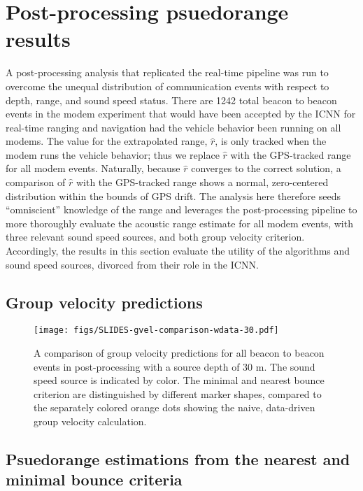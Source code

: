\FloatBarrier
\section{\label{sec:5} Post-processing psuedorange results}

A post-processing analysis that replicated the real-time pipeline was run to overcome the unequal distribution of communication events with respect to depth, range, and sound speed status.
There are 1242 total beacon to beacon events in the modem experiment that would have been accepted by the ICNN for real-time ranging and navigation had the vehicle behavior been running on all modems.
The value for the extrapolated range, $\hat{r}$, is only tracked when the modem runs the vehicle behavior; thus we replace $\hat{r}$ with the GPS-tracked range for all modem events.
Naturally, because $\hat{r}$ converges to the correct solution, a comparison of $\hat{r}$ with the GPS-tracked range shows a normal, zero-centered distribution within the bounds of GPS drift.
The analysis here therefore seeds ``omniscient'' knowledge of the range and leverages the post-processing pipeline to more thoroughly evaluate the acoustic range estimate for all modem events, with three relevant sound speed sources, and both group velocity criterion.
Accordingly, the results in this section evaluate the utility of the algorithms and sound speed sources, divorced from their role in the ICNN.

\FloatBarrier
\subsection{Group velocity predictions}

\begin{figure}[h!]
\texttt{[image: figs/SLIDES-gvel-comparison-wdata-30.pdf]}
\caption{\label{fig:gvel30}{A comparison of group velocity predictions for all beacon to beacon events in post-processing with a source depth of 30 m. The sound speed source is indicated by color. The minimal and nearest bounce criterion are distinguished by different marker shapes, compared to the separately colored orange dots showing the naive, data-driven group velocity calculation.}}
\end{figure}

\FloatBarrier
\subsection{Psuedorange estimations from the nearest and minimal bounce criteria}

